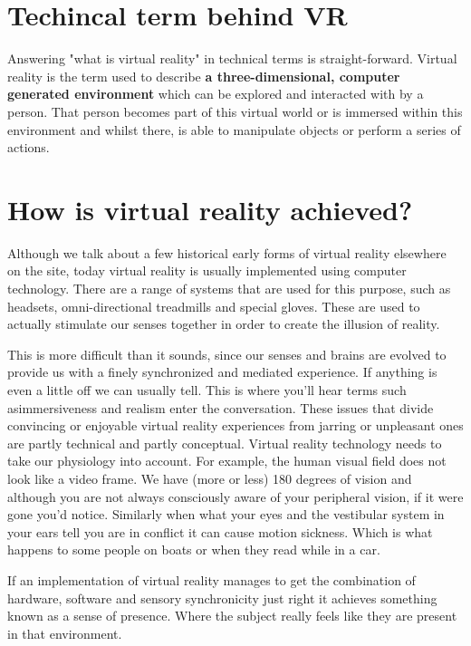 \section{Techincal term behind VR}

Answering "what is virtual reality" in technical terms is straight-forward. Virtual reality is the term used to describe\textbf{ a three-dimensional, computer generated environment} which can be explored and interacted with by a person. That person becomes part of this virtual world or is immersed within this environment and whilst there, is able to manipulate objects or perform a series of actions.

\section{How is virtual reality achieved?}

Although we talk about a few historical early forms of virtual reality elsewhere on the site, today virtual reality is usually implemented using computer technology. There are a range of systems that are used for this purpose, such as headsets, omni-directional treadmills and special gloves. These are used to actually stimulate our senses together in order to create the illusion of reality.

This is more difficult than it sounds, since our senses and brains are evolved to provide us with a finely synchronized and mediated experience. If anything is even a little off we can usually tell. This is where you’ll hear terms such asimmersiveness  and realism enter the conversation. These issues that divide convincing or enjoyable virtual reality experiences from jarring or unpleasant ones are partly technical and partly conceptual. Virtual reality technology needs to take our physiology into account. For example, the human visual field does not look like a video frame. We have (more or less) 180 degrees of vision and although you are not always consciously aware of your peripheral vision, if it were gone you’d notice. Similarly when what your eyes and the vestibular system in your ears tell you are in conflict it can cause motion sickness. Which is what happens to some people on boats or when they read while in a car.

If an implementation of virtual reality manages to get the combination of hardware, software and sensory synchronicity just right it achieves something known as a sense of presence. Where the subject really feels like they are present in that environment.

